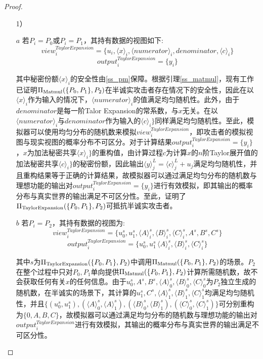 \begin{proof}
	\begin{itemize}
		\item [1）]
		
		\item [$a$]
		若$P_i=P_0$或$P_i=P_1$，其持有数据的视图如下:
		$$view_i^{TaylorExpansion}=\{u_i, \langle x\rangle_i,\langle numerator\rangle_i, denominator, \langle c\rangle_i\}$$
		$$output_i^{TaylorExpansion}=\{y_i\}$$
		
		其中秘密份额$\langle x\rangle_i$的安全性由\ref{ss_pm}保障。根据引理\ref{ss_matmul}，现有工作已证明$\Pi_{\rm Matmul}(\{P_0, P_1\}, P_2)$在半诚实攻击者存在情况下的安全性，因此在以$\langle x\rangle_i$作为输入的情况下，$\langle numerator\rangle_i$的值满足均匀随机性。此外，由于$denominator$是每一阶Talor Expansion的常系数，与$x$无关。在以$\langle numerator\rangle_i$与$denominator$作为输入的$\langle c\rangle_i\}$同样满足均匀随机性。至此，模拟器可以使用均匀分布的随机数来模拟$view_i^{TaylorExpansion}$，即攻击者的模拟视图与现实视图的概率分布不可区分。对于计算结果$output_i^{TaylorExpansion}=\{y_i\}$，$x$为加法秘密共享$\langle x\rangle_i\}$的重构值，由计算过程$c$为计算$x$的$n$阶Taylor展开值的加法秘密共享$\langle c\rangle_i\}$的秘密份额，因此输出$\langle y\rangle_j^L = \langle c\rangle_j^L + u_j$满足均匀随机性，并且重构结果等于正确的计算结果，故模拟器可以通过满足均匀分布的随机数与理想功能的输出对$output_i^{TaylorExpansion}=\{y_i\}$进行有效模拟，即其输出的概率分布与真实世界的输出满足不可区分性。至此，证明了$\Pi_{\rm TaylorExpansion}(\{P_0, P_1\}, P_2)$可抵抗半诚实攻击者。
		
		\item [$b$]
		若$P_i=P_2$，其持有数据的视图为:
		$$view_i^{TaylorExpansion}=\{u_0^s, u_1^s, \langle A\rangle_i^s,\langle B\rangle_i^s,\langle C\rangle_i^s, A^s, B^s, C^s\}$$
		$$output_i^{TaylorExpansion}=\{u_0^s, u_1^s\, \langle A\rangle_i^s,\langle B\rangle_i^s,\langle C\rangle_i^s\}$$
	
		其中$s$为$\Pi_{\rm TaylorExpansion}(\{P_0, P_1\}, P_2)$中调用$\Pi_{\rm Matmul}(\{P_0, P_1\}, P_2)$的场景。$P_2$在整个过程中只对$P_0, P_1$单向提供$\Pi_{\rm Matmul}(\{P_0, P_1\}, P_2)$计算所需随机数，故不会获取任何有关$x$的任何信息。由于$u_0^s, A^s, B^s, \langle A\rangle_0^s,\langle B\rangle_0^s,\langle C\rangle_0^s$为$P_2$独立生成的随机数，在半诚实的场景下，其计算的$u_1^s, C^s, \langle A\rangle_1^s,\langle B\rangle_1^s,\langle C\rangle_1^s$均满足均匀随机性，并且$\{(u_0^s, u_1^s), (\langle A\rangle_0^s, \langle A\rangle_1^s), (\langle B\rangle_0^s, \langle B\rangle_1^s), (\langle C\rangle_0^s, \langle C\rangle_1^s)\}$可分别重构为$\{0, A, B, C\}$，故模拟器可以通过满足均匀分布的随机数与理想功能的输出对$output_i^{TaylorExpansion}$进行有效模拟，其输出的概率分布与真实世界的输出满足不可区分性。
		

\end{itemize}
\end{proof}
